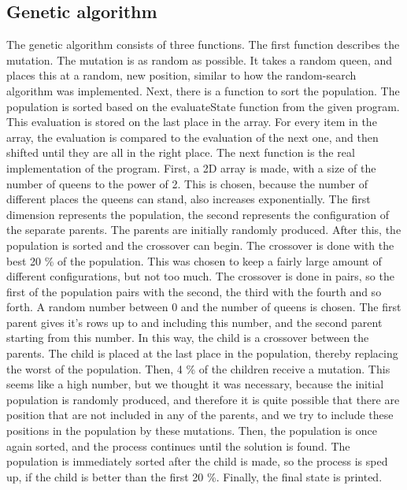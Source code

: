 \documentclass{article}
\begin{document}
	
	\subsection*{Genetic algorithm}
	
	The genetic algorithm consists of three functions. The first function describes the mutation. The mutation is as random as possible. It takes a random queen, and places this at a random, new position, similar to how the random-search algorithm was implemented. Next, there is a function to sort the population. The population is sorted based on the evaluateState function from the given program. This evaluation is stored on the last place in the array. For every item in the array, the evaluation is compared to the evaluation of the next one, and then shifted until they are all in the right place. The next function is the real implementation of the program. First, a 2D array is made, with a size of the number of queens to the power of 2. This is chosen, because the number of different places the queens can stand, also increases exponentially. The first dimension represents the population, the second represents the configuration of the separate parents. The parents are initially randomly produced. After this, the population is sorted and the crossover can begin. The crossover is done with the best 20 \% of the population. This was chosen to keep a fairly large amount of different configurations, but not too much. The crossover is done in pairs, so the first of the population pairs with the second, the third with the fourth and so forth. A random number between 0 and the number of queens is chosen. The first parent gives it's rows up to and including this number, and the second parent starting from this number. In this way, the child is a crossover between the parents. The child is placed at the last place in the population, thereby replacing the worst of the population. Then, 4 \% of the children receive a mutation. This seems like a high number, but we thought it was necessary, because the initial population is randomly produced, and therefore it is quite possible that there are position that are not included in any of the parents, and we try to include these positions in the population by these mutations. Then, the population is once again sorted, and the process continues until the solution is found. The population is immediately sorted after the child is made, so the process is sped up, if the child is better than the first 20 \%. Finally, the final state is printed.
	
\end{document}
